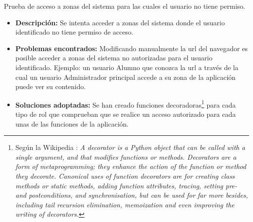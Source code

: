 \item Prueba de acceso a zonas del sistema para las cuales el usuario no tiene
permiso.
  \begin{itemize}
    \item \textbf{Descripción:} Se intenta acceder a zonas del sistema donde el
    usuario identificado no tiene permiso de acceso.
    \item \textbf{Problemas encontrados:} Modificando manualmente la url del
    navegador es posible acceder a zonas del sistema no autorizadas para el
    usuario identificado. Ejemplo: un usuario Alumno que conozca la url a través
    de la cual un usuario Administrador principal accede a su zona de la
    aplicación puede ver su contenido.
    \item \textbf{Soluciones adoptadas:} Se han creado funciones
    decoradoras\footnote{Según la Wikipedia \cite{wikipedia} : \textit{A
    decorator is a Python object that can be called with a single argument, and
    that modifies functions or methods. Decorators are a form of
    metaprogramming; they enhance the action of the function or method they
    decorate. Canonical uses of function decorators are for creating class
    methods or static methods, adding function attributes, tracing, setting pre-
    and postconditions, and synchronisation, but can be used for far more
    besides, including tail recursion elimination, memoization and even
    improving the writing of decorators.}}
    para cada tipo de rol que comprueban que se realice un acceso autorizado
    para cada unas de las funciones de la aplicación.
  \end{itemize}

